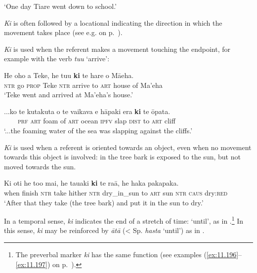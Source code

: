 \glt
‘One day Tiare went down to school.’ \textstyleExampleref{[R170.001]} 
\z

\textit{Ki} is often followed by a locational indicating the direction in which the movement takes place (see e.g.  on p.~\pageref{ex:3.133}). 

\textit{Ki} is used when the referent makes a movement touching the endpoint, for example with the verb \textit{tu{\ꞌ}u} ‘arrive’:

\ea\label{ex:4.263}
\gll He oho a Teke, he tu{\ꞌ}u \textbf{ki} te hare o Mā{\ꞌ}eha. \\
\textsc{ntr} go \textsc{prop} Teke \textsc{ntr} arrive to \textsc{art} house of Ma’eha \\

\glt 
‘Teke went and arrived at Ma’eha’s house.’ \textstyleExampleref{[MsE-059.005]}
\z

\ea\label{ex:4.264}
\gll ...ko te kutakuta o te vaikava e hāpaki era \textbf{ki} te {\ꞌ}ōpata.\\
~~~~\textsc{prf} \textsc{art} foam of \textsc{art} ocean \textsc{ipfv} slap \textsc{dist} to \textsc{art} cliff\\

\glt 
‘...the foaming water of the sea was slapping against the cliffs.’ \textstyleExampleref{[R408.105]} 
\z

\textit{Ki} is used when a referent is oriented towards an object, even when no movement towards this object is involved: in  the tree bark is exposed to the sun, but not moved towards the sun.

\ea\label{ex:4.265}
\gll Ki oti he to{\ꞌ}o mai, he tauaki \textbf{ki} te ra{\ꞌ}ā, he haka pakapaka. \\
when finish \textsc{ntr} take hither \textsc{ntr} dry\_in\_sun to \textsc{art} sun \textsc{ntr} \textsc{caus} dry:\textsc{red} \\

\glt 
‘After that they take (the tree bark) and put it in the sun to dry.’ \textstyleExampleref{[Ley-5-04.009]}
\z

In a temporal sense, \textit{ki} indicates the end of a stretch of time: ‘until’, as in .\footnote{\label{fn:230}The preverbal marker \textit{ki} has the same function (see examples (\ref{ex:11.196}–\ref{ex:11.197}) on p.~\pageref{ex:11.196}).} In this sense, \textit{ki} may be reinforced by \textit{{\ꞌ}ātā} ({\textless} Sp. \textit{hasta} ‘until’) as in .

